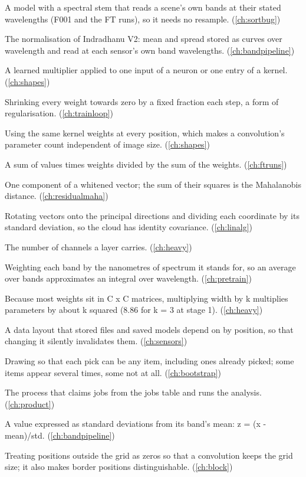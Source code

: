 \begin{description}[style=nextline,leftmargin=1.2em,font=\normalfont\bfseries]
\item[Wavelength-reading model] A model with a spectral stem that reads a scene's own bands at their stated wavelengths (F001 and the FT runs), so it needs no resample. (\cref{ch:sortbug})
\item[WavelengthStats] The normalisation of Indradhanu V2: mean and spread stored as curves over wavelength and read at each sensor's own band wavelengths. (\cref{ch:bandpipeline})
\item[Weight] A learned multiplier applied to one input of a neuron or one entry of a kernel. (\cref{ch:shapes})
\item[Weight decay] Shrinking every weight towards zero by a fixed fraction each step, a form of regularisation. (\cref{ch:trainloop})
\item[Weight sharing] Using the same kernel weights at every position, which makes a convolution's parameter count independent of image size. (\cref{ch:shapes})
\item[Weighted mean] A sum of values times weights divided by the sum of the weights. (\cref{ch:ftruns})
\item[Whitened coordinate] One component of a whitened vector; the sum of their squares is the Mahalanobis distance. (\cref{ch:residualmaha})
\item[Whitening] Rotating vectors onto the principal directions and dividing each coordinate by its standard deviation, so the cloud has identity covariance. (\cref{ch:linalg})
\item[Width] The number of channels a layer carries. (\cref{ch:heavy})
\item[Width weighting] Weighting each band by the nanometres of spectrum it stands for, so an average over bands approximates an integral over wavelength. (\cref{ch:pretrain})
\item[Width-squared scaling] Because most weights sit in C x C matrices, multiplying width by k multiplies parameters by about k squared (8.86 for k = 3 at stage 1). (\cref{ch:heavy})
\item[Wire format] A data layout that stored files and saved models depend on by position, so that changing it silently invalidates them. (\cref{ch:sensors})
\item[With replacement] Drawing so that each pick can be any item, including ones already picked; some items appear several times, some not at all. (\cref{ch:bootstrap})
\item[Worker] The process that claims jobs from the jobs table and runs the analysis. (\cref{ch:product})
\item[z-score] A value expressed as standard deviations from its band's mean: z = (x - mean)/std. (\cref{ch:bandpipeline})
\item[Zero padding] Treating positions outside the grid as zeros so that a convolution keeps the grid size; it also makes border positions distinguishable. (\cref{ch:block})
\end{description}
